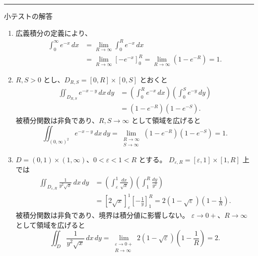 \documentclass[a4paper,10pt,dvipdfmx]{jsarticle}
\renewcommand{\topic}[1]{\par\vspace{5pt}%
  {\large\normalfont\mdseries\color{accent}#1}\par\vspace{1pt}}
\begin{document}
\par\vspace{4mm}
{\color{accent}\rule{\linewidth}{0.6pt}}
\topic{小テストの解答}
\begin{enumerate}[label=\color{accent}\arabic*.,leftmargin=2.4em,itemsep=9pt]
\item 広義積分の定義により、
$$
 \begin{aligned}
 \int_0^\infty e^{-x}\,dx
 &=\lim_{R\to\infty}\int_0^R e^{-x}\,dx\\
 &=\lim_{R\to\infty}\left[-e^{-x}\right]_0^R
 =\lim_{R\to\infty}(1-e^{-R})=1.
 \end{aligned}
$$

\item $R,S>0$ とし、$D_{R,S}=[0,R]\times[0,S]$ とおくと
$$
 \begin{aligned}
 \iint_{D_{R,S}}e^{-x-y}\,dx\,dy
 &=\left(\int_0^R e^{-x}\,dx\right)
   \left(\int_0^S e^{-y}\,dy\right)\\
 &=(1-e^{-R})(1-e^{-S}).
 \end{aligned}
$$
被積分関数は非負であり、$R,S\to\infty$ として領域を広げると
$$
 \iint_{(0,\infty)^2}e^{-x-y}\,dx\,dy
 =\lim_{\substack{R\to\infty\\S\to\infty}}
   (1-e^{-R})(1-e^{-S})=1.
$$

\item $D=(0,1)\times(1,\infty)$、$0<\varepsilon<1<R$ とする。
$D_{\varepsilon,R}=[\varepsilon,1]\times[1,R]$ 上では
$$
 \begin{aligned}
 \iint_{D_{\varepsilon,R}}\frac{1}{y^2\sqrt{x}}\,dx\,dy
 &=\left(\int_\varepsilon^1\frac{dx}{\sqrt{x}}\right)
   \left(\int_1^R\frac{dy}{y^2}\right)\\
 &=\left[2\sqrt{x}\right]_\varepsilon^1
   \left[-\frac1y\right]_1^R
 =2(1-\sqrt{\varepsilon})\left(1-\frac1R\right).
 \end{aligned}
$$
被積分関数は非負であり、境界は積分値に影響しない。
$\varepsilon\to0+$、$R\to\infty$ として領域を広げると
$$
 \iint_D\frac{1}{y^2\sqrt{x}}\,dx\,dy
 =\lim_{\substack{\varepsilon\to0+\\R\to\infty}}
  2(1-\sqrt{\varepsilon})\left(1-\frac1R\right)=2.
$$
\end{enumerate}
\end{document}
